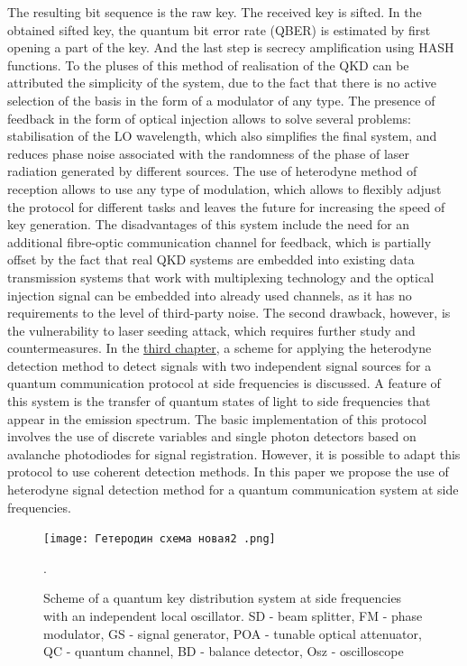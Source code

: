 {The resulting bit sequence is the raw key. The received key is sifted. In the obtained sifted key, the quantum bit error rate (QBER) is estimated by first opening a part of the key. And the last step is secrecy amplification using HASH functions.
To the pluses of this method of realisation of the QKD can be attributed the simplicity of the system, due to the fact that there is no active selection of the basis in the form of a modulator of any type. The presence of feedback in the form of optical injection allows to solve several problems: stabilisation of the LO wavelength, which also simplifies the final system, and reduces phase noise associated with the randomness of the phase of laser radiation generated by different sources. The use of heterodyne method of reception allows to use any type of modulation, which allows to flexibly adjust the protocol for different tasks and leaves the future for increasing the speed of key generation.
\newline The disadvantages of this system include the need for an additional fibre-optic communication channel for feedback, which is partially offset by the fact that real QKD systems are embedded into existing data transmission systems that work with multiplexing technology and the optical injection signal can be embedded into already used channels, as it has no requirements to the level of third-party noise. The second drawback, however, is the vulnerability to laser seeding attack, which requires further study and countermeasures. 
\newpage In the \underline{third chapter}, a scheme for applying the heterodyne detection method to detect \cite{brunner2017,delange1968,kuri2003} signals with two independent signal sources \cite{hajomer2024,shao2022} for a quantum communication protocol at side frequencies is discussed. A feature of this system is the transfer of quantum states of light to side frequencies that appear in the emission spectrum. The basic implementation of this protocol involves the use of discrete variables and single photon detectors based on avalanche photodiodes for signal registration. However, it is possible to adapt this protocol to use coherent detection methods\cite{samsonov2021,fadeev2024}. 
\newline In this paper we propose the use of heterodyne signal detection method for a quantum communication system at side frequencies.
\begin{figure}
    \centering
    \texttt{[image: Гетеродин схема новая2 .png]}
    \caption{Scheme of a quantum key distribution system at side frequencies with an independent local oscillator. SD - beam splitter, FM - phase modulator, GS - signal generator, POA - tunable optical attenuator, QC - quantum channel, BD - balance detector, Osz - oscilloscope}.

\end{figure}}
